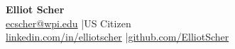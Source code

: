 \begin{center}
{\Large \textbf{Elliot Scher}}\\[2pt]
\href{mailto:ecscher@wpi.edu}{ecscher@wpi.edu} \quad|\quad US Citizen\\
\href{https://linkedin.com/in/elliotscher}{linkedin.com/in/elliotscher} \quad|\quad \href{https://github.com/ElliotScher}{github.com/ElliotScher}
\end{center}